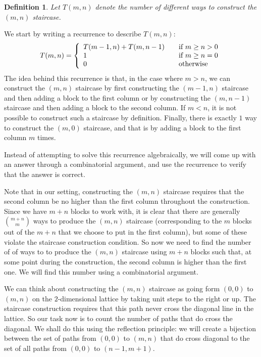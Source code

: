 \documentclass[12pt]{amsart}
\newtheorem{definition}[theorem]{Definition}
\begin{document}
\begin{definition}
Let $T(m,n)$ denote the number of different ways to construct the $(m,n)$ staircase.
\end{definition}

We start by writing a recurrence to describe $T(m,n)$:
\begin{equation}
T(m,n) = \left\{ 
  \begin{array}{l l}
    T(m-1,n) + T(m,n-1) & \quad \text{if $m \geq n > 0$}\\
    1 & \quad \text{if $m \geq n = 0$}\\
    0 & \quad \text{otherwise}\\
  \end{array} \right.
\label{eqn:2-recurrence}
\end{equation}
The idea behind this recurrence is that, in the case where $m > n$, we can construct the $(m,n)$ staircase by first constructing the $(m-1,n)$ staircase and then adding a block to the first column or by constructing the $(m,n-1)$ staircase and then adding a block to the second column. If $m < n$, it is not possible to construct such a staircase by definition. Finally, there is exactly $1$ way to construct the $(m,0)$ staircase, and that is by adding a block to the first column $m$ times.

Instead of attempting to solve this recurrence algebraically, we will come up with an answer through a combinatorial argument, and use the recurrence to verify that the answer is correct.

Note that in our setting, constructing the $(m,n)$ staircase requires that the second column be no higher than the first column throughout the construction. Since we have $m+n$ blocks to work with, it is clear that there are generally $\binom{m+n}{m}$ ways to produce the $(m,n)$ staircase (corresponding to the $m$ blocks out of the $m+n$ that we choose to put in the first column), but some of these violate the staircase construction condition. So now we need to find the number of of ways to to produce the $(m,n)$ staircase using $m+n$ blocks such that, at some point during the construction, the second column is higher than the first one. We will find this number using a combinatorial argument.

We can think about constructing the $(m,n)$ staircase as going form $(0,0)$ to $(m,n)$ on the $2$-dimensional lattice by taking unit steps to the right or up. The staircase construction requires that this path never cross the diagonal line in the lattice. So our task now is to count the number of paths that do cross the diagonal. We shall do this using the reflection principle: we will create a bijection between the set of paths from $(0,0)$ to $(m,n)$ that do cross diagonal to the set of all paths from $(0,0)$ to $(n-1,m+1)$.
\end{document}
